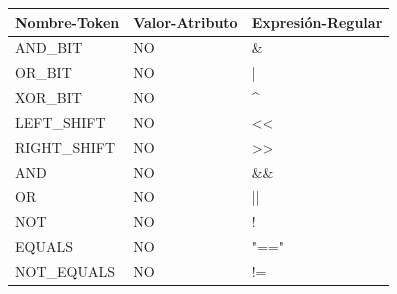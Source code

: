 \documentclass[11pt, english]{article}
\begin{document}
\begin{table}[H]
	\begin{tabular}{l|l|l}
		\toprule
		\textbf{Nombre-Token} & \textbf{Valor-Atributo} & \textbf{Expresión-Regular}\\
		\midrule
		AND\_BIT                                                 & NO                                                                   & \&                                                                  \\
		OR\_BIT                                                  & NO                                                                   & |                                                                   \\
		XOR\_BIT                                                 & NO                                                                   & \textasciicircum{}                                                  \\
		LEFT\_SHIFT                                              & NO                                                                   & \textless{}\textless{}                                              \\
		RIGHT\_SHIFT                                             & NO                                                                   & \textgreater{}\textgreater{}                                        \\
		AND                                                      & NO                                                                   & \&\&                                                                \\
		OR                                                       & NO                                                                   & ||                                                                  \\
		NOT                                                      & NO                                                                   & !                                                                   \\
		EQUALS                                                   & NO                                                                   & "=="                                                                \\
		NOT\_EQUALS                                              & NO                                                                   & !=                                                                  \\

\end{tabular}
\end{table}
\end{document}
